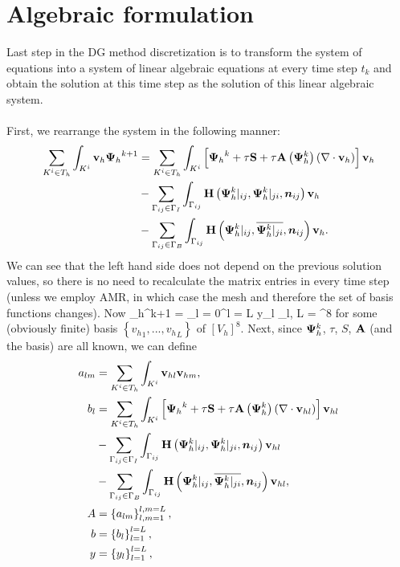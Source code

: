 \section{Algebraic formulation}
Last step in the DG method discretization is to transform the system of equations  into a system of linear algebraic equations at every time step $t_k$ and obtain the solution at this time step as the solution of this linear algebraic system.
\paragraph{}
First, we rearrange the system in the following manner:
\begin{align}
\label{RewrittenLinearSystem} \sum_{K^i \in T_h}\int_{K^i} \mathrm{\mathbf{v}}_h {\mathrm{\mathbf{\Psi}}_h}^{k+1} & = 
\sum_{K^i \in T_h}\int_{K^i} \left[{\mathrm{\mathbf{\Psi}}_h}^{k} + \tau\mathrm{\mathbf{S}} + \tau\mathrm{\mathbf{A}}\left({\mathrm{\mathbf{\Psi}}_h^{k}}\right) \left(\nabla \cdot \mathrm{\mathbf{v}}_h\right)\right] \mathrm{\mathbf{v}}_h \\\nonumber& - \sum_{\Gamma_{ij}\in\Gamma_I} \int_{\Gamma_{ij}}\mathrm{\mathbf{H}}\left({\mathrm{\mathbf{\Psi}}_h^{k}}|_{ij}, {\mathrm{\mathbf{\Psi}}_h^{k}}|_{ji}, \mbox{\boldmath $n$}_{ij}\right) \mathrm{\mathbf{v}}_h
\\\nonumber& - \sum_{\Gamma_{ij}\in\Gamma_B} \int_{\Gamma_{ij}} \mathrm{\mathbf{H}}\left({\mathrm{\mathbf{\Psi}}_h^{k}}|_{ij}, \overline{{\mathrm{\mathbf{\Psi}}_h^{k}}|_{ji}}, \mbox{\boldmath $n$}_{ij}\right) \mathrm{\mathbf{v}}_h.
\end{align}
We can see that the left hand side does not depend on the previous solution values, so there is no need to recalculate the matrix entries in every time step (unless we employ AMR, in which case the mesh and therefore the set of basis functions changes).
Now
\be
\label{Coeffs} {\mrPsi_h}^{k+1} = \sum_{l = 0}^{l = L} y_l {\mrvh}_l, L = \lo\left[V_h\right]^8\ro
\ee
for some (obviously finite) basis $\left\{{v_h}_1, ..., {v_h}_L\right\}$ of $\left[V_h\right]^8$.
Next, since $\mathrm{\mathbf{\Psi}}_h^{k}$, $\tau$, $S$, $\mathrm{\mathbf{A}}$ (and the basis) are all known, we can define
\begin{align}
\label{Linear1}
a_{lm} & =  \sum_{K^i \in T_h}\int_{K^i} \mathrm{\mathbf{v}}_{hl} \mathrm{\mathbf{v}}_{hm}, \\
\label{Linear2}
b_{l} & =  \sum_{K^i \in T_h}\int_{K^i} \left[{\mathrm{\mathbf{\Psi}}_h}^{k} + \tau\mathrm{\mathbf{S}} + \tau\mathrm{\mathbf{A}}\left({\mathrm{\mathbf{\Psi}}_h^{k}}\right) \left(\nabla \cdot \mathrm{\mathbf{v}}_{hl}\right)\right] \mathrm{\mathbf{v}}_{hl}\\\nonumber & - \sum_{\Gamma_{ij}\in\Gamma_I} \int_{\Gamma_{ij}}\mathrm{\mathbf{H}}\left({\mathrm{\mathbf{\Psi}}_h^{k}}|_{ij}, {\mathrm{\mathbf{\Psi}}_h^{k}}|_{ji}, \mbox{\boldmath $n$}_{ij}\right) \mathrm{\mathbf{v}}_{hl}\\\nonumber& - 
\sum_{\Gamma_{ij}\in\Gamma_B} \int_{\Gamma_{ij}} \mathrm{\mathbf{H}}\left({\mathrm{\mathbf{\Psi}}_h^{k}}|_{ij}, \overline{{\mathrm{\mathbf{\Psi}}_h^{k}}|_{ji}}, \mbox{\boldmath $n$}_{ij}\right) \mathrm{\mathbf{v}}_{hl},\\
\label{Linear3}
A & =  \left\{a_{lm}\right\}_{l,m = 1}^{l,m = L},\\
\label{Linear4}
b & =  \left\{b_{l}\right\}_{l = 1}^{l = L},\\
y & =  \left\{y_{l}\right\}_{l = 1}^{l = L},
\label{Linear5}
\end{align}
